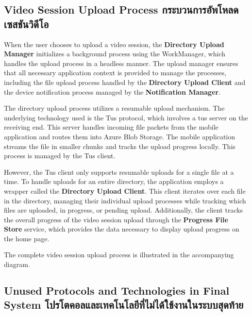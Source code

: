 \subsection{\ifenglish Video Session Upload Process \else กระบวนการอัพโหลดเซสชันวิดีโอ \fi}
When the user chooses to upload a video session, the \textbf{Directory Upload Manager} initializes a background process using the WorkManager, which handles the upload process in a headless manner. The upload manager ensures that all necessary application context is provided to manage the processes, including the file upload process handled by the \textbf{Directory Upload Client} and the device notification process managed by the \textbf{Notification Manager}.

The directory upload process utilizes a resumable upload mechanism. The underlying technology used is the Tus protocol, which involves a tus server on the receiving end. This server handles incoming file packets from the mobile application and routes them into Azure Blob Storage. The mobile application streams the file in smaller chunks and tracks the upload progress locally. This process is managed by the Tus client.

However, the Tus client only supports resumable uploads for a single file at a time. To handle uploads for an entire directory, the application employs a wrapper called the \textbf{Directory Upload Client}. This client iterates over each file in the directory, managing their individual upload processes while tracking which files are uploaded, in progress, or pending upload. Additionally, the client tracks the overall progress of the video session upload through the \textbf{Progress File Store} service, which provides the data necessary to display upload progress on the home page.

The complete video session upload process is illustrated in the accompanying diagram.


\subsection{\ifenglish Unused Protocols and Technologies in Final System \else โปรโตคอลและเทคโนโลยีที่ไม่ได้ใช้งานในระบบสุดท้าย \fi}